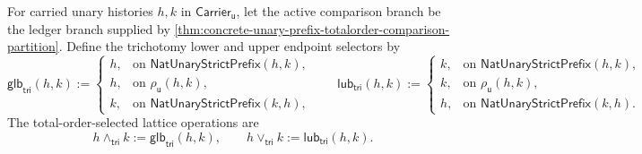 \begin{definition}
\label{def:totalorder-prefix-lattice-selectors}
For carried unary histories $h,k$ in $\mathsf{Carrier}_{\mathsf{u}}$, let the active comparison branch be the ledger branch supplied by \autoref{thm:concrete-unary-prefix-totalorder-comparison-partition}. Define the trichotomy lower and upper endpoint selectors by
$$
\mathsf{glb}_{\mathsf{tri}}(h,k):=
\begin{cases}
h, & \text{on } \mathsf{NatUnaryStrictPrefix}(h,k),\\
h, & \text{on } \rho_{\mathsf{u}}(h,k),\\
k, & \text{on } \mathsf{NatUnaryStrictPrefix}(k,h),
\end{cases}
\qquad
\mathsf{lub}_{\mathsf{tri}}(h,k):=
\begin{cases}
k, & \text{on } \mathsf{NatUnaryStrictPrefix}(h,k),\\
k, & \text{on } \rho_{\mathsf{u}}(h,k),\\
h, & \text{on } \mathsf{NatUnaryStrictPrefix}(k,h).
\end{cases}
$$
The total-order-selected lattice operations are
$$
h\wedge_{\mathsf{tri}}k:=\mathsf{glb}_{\mathsf{tri}}(h,k),
\qquad
h\vee_{\mathsf{tri}}k:=\mathsf{lub}_{\mathsf{tri}}(h,k).
$$
\end{definition}

